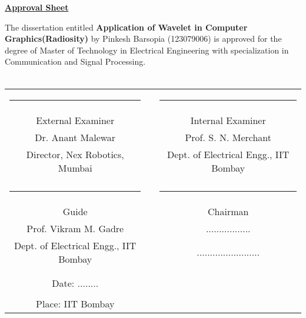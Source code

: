 \documentclass{article}
\begin{document}
\begin{titlepage}
\onehalfspacing
\begin{center}
	
\vspace{1cm}
\textbf{\large{\underline{Approval Sheet}}}\\
\vspace{0.5cm}
\end{center}
\doublespacing
The dissertation entitled \textbf{Application of Wavelet in Computer Graphics(Radiosity)} by Pinkesh Barsopia (123079006) is approved for the degree of Master of Technology in Electrical Engineering with specialization in Communication and Signal Processing.
\\ \\
\begin{center}
 \vfill \vfill
 \begin{tabular}{ccc}
      \rule{6cm}{1sp}                & \rule{10mm}{0pt} & \rule{6cm}{1sp} \\
      {\Large External Examiner}              && {\Large Internal Examiner} \\
      {Dr. Anant Malewar}	     && {Prof. S. N. Merchant} \\			  	
      {Director, Nex Robotics, Mumbai} && {Dept. of Electrical Engg., IIT Bombay } \\[0.2in]\\
      \rule{6cm}{1sp}                & \rule{10mm}{0pt} & \rule{6cm}{1sp} \\
      {\Large Guide}                 && {\Large Chairman} \\
      {Prof. Vikram M. Gadre}	     && {.................} \\
      {Dept. of Electrical Engg., IIT Bombay}	     && {........................}\\[0.2in]\\	\\
      {\Large Date: ........ }   && \\ && \\
      {\Large Place: IIT Bombay}	&&	
   \end{tabular}
 \vfill \vfill
% 
\end{center}
\end{titlepage}
\end{document}
